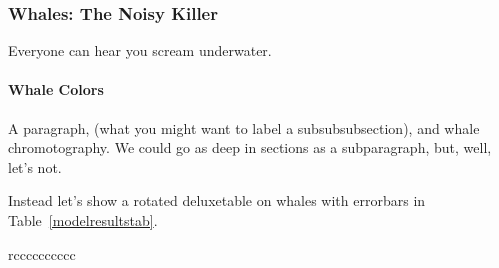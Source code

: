 \subsubsection{Whales: The Noisy Killer}

Everyone can hear you scream underwater.

\paragraph{Whale Colors}

A paragraph, (what you might want to label a subsubsubsection), and whale chromotography. We could go as deep in sections as a subparagraph, but, well, let's not.

Instead let's show a rotated deluxetable on whales with errorbars in Table~\ref{modelresultstab}.

\begin{deluxetable}{rcccccccccc}
  \rotate  %
  \tablewidth{0pt}  %
  \tabletypesize{\scriptsize}
  \startdata
  
  
  
  
  \enddata
  \label{modelresultstab}
\end{deluxetable}


